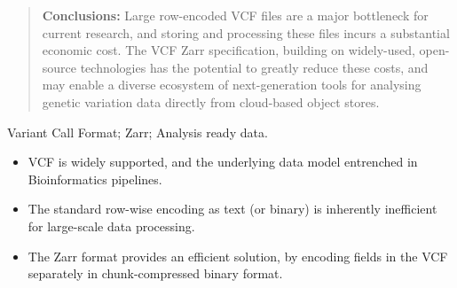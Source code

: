 \documentclass[a4paper,num-refs]{oup-contemporary}
\begin{document}
\begin{frontmatter}
\begin{abstract}
\textbf{Conclusions:}
Large row-encoded VCF files are a major bottleneck for current research, and 
storing and processing these files incurs a substantial economic cost.
The VCF Zarr specification, building on widely-used, open-source technologies
has the potential to greatly reduce these costs, 
and may enable a diverse ecosystem of next-generation tools for analysing 
genetic variation data directly from cloud-based object stores.
\end{abstract}

\begin{keywords}
Variant Call Format; Zarr; Analysis ready data.
\end{keywords}
\end{frontmatter}

\begin{keypoints*}
\begin{itemize}
\item VCF is widely supported, and the underlying data model entrenched 
in Bioinformatics pipelines.
\item The standard row-wise encoding as text (or binary) is inherently
inefficient for large-scale data processing.
\item The Zarr format provides an efficient solution, by encoding fields
in the VCF separately in chunk-compressed binary format.
\end{itemize}
\end{keypoints*}
\end{document}
